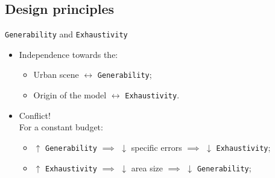 \documentclass[10pt]{beamer}
\begin{document}
        \subsection{Design principles}
            \begin{frame}{\texttt{Generability} and \texttt{Exhaustivity}}
                \begin{itemize}[label=$\blacktriangleright$, font=\color{IGNGreen}, itemsep=2em]
                    \item<1-> Independence towards the:
                        \begin{itemize}[label=$\blacktriangleright$, font=\color{IGNGreen}, itemsep=2em]
                            \item<2-> Urban scene \(\leftrightarrow\) \texttt{Generability};
                            \item<3-> Origin of the model \(\leftrightarrow\) \texttt{Exhaustivity}.
                        \end{itemize}
                    \item<4-> Conflict!\\For a constant budget:
                        \begin{itemize}[label=$\blacktriangleright$, font=\color{IGNGreen}, itemsep=2em]
                            \item<5-> \(\uparrow\) \texttt{Generability} \(\implies\) \(\downarrow\) specific errors \(\implies\) \(\downarrow\) \texttt{Exhaustivity};
                            \item<6-> \(\uparrow\) \texttt{Exhaustivity} \(\implies\) \(\downarrow\) area size \(\implies\) \(\downarrow\) \texttt{Generability};
                        \end{itemize}
                \end{itemize}
            \end{frame}
\end{document}
